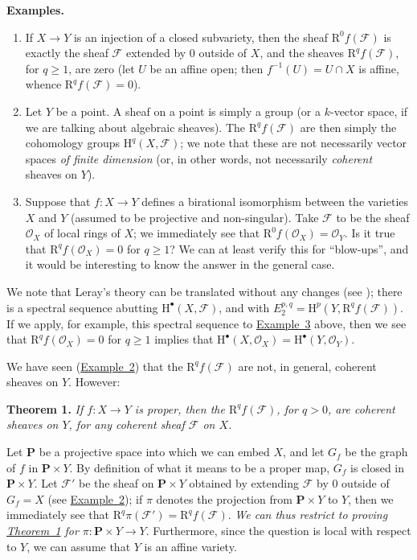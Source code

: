\documentclass{article}
\newenvironment{itenv}[1]
  {\phantomsection\par\medskip\noindent\textbf{#1.}\itshape}
  {\par\medskip}
\newenvironment{rmenv}[1]
  {\phantomsection\par\medskip\noindent\textbf{#1.}\rmfamily}
  {\par\medskip}
\newcommand{\scr}[1]{{\mathscr{#1}}}
\newcommand{\HH}{\mathrm{H}}
\newcommand{\RR}{\mathrm{R}}
\newcommand{\PP}{\mathbf{P}}
\renewcommand{\geq}{\geqslant}
\newcommand{\oldpage}[1]{\marginpar{\footnotesize$\Big\vert$ \textit{p.~#1}}}
\begin{document}
\begin{rmenv}{Examples}
  \phantom{.}
  \begin{enumerate}
    \item If $X\to Y$ is an injection of a closed subvariety, then the sheaf $\RR^0f(\scr{F})$ is exactly the sheaf $\scr{F}$ extended by $0$ outside of $X$, and the sheaves $\RR^qf(\scr{F})$, for $q\geq1$, are zero (let $U$ be an affine open; then $f^{-1}(U)=U\cap X$ is affine, whence $\RR^qf(\scr{F})=0$).
      \label{example1}
    \item Let $Y$ be a point.
      A sheaf on a point is simply a group (or a $k$-vector space, if we are talking about algebraic sheaves).
      The $\RR^qf(\scr{F})$ are then simply the cohomology groups $\HH^q(X,\scr{F})$;
      we note that these are not necessarily vector spaces \emph{of finite dimension} (or, in other words, not necessarily \emph{coherent} sheaves on $Y$).
        \label{example2}
    \item Suppose that $f\colon X\to Y$ defines a birational isomorphism between the varieties $X$ and $Y$ (assumed to be projective and non-singular).
      Take $\scr{F}$ to be the sheaf $\scr{O}_X$ of local rings of $X$;
      we immediately see that $\RR^0f(\scr{O}_X)=\scr{O}_Y$.
      Is it true that $\RR^qf(\scr{O}_X)=0$ for $q\geq1$?
      We can at least verify this for ``blow-ups'', and it would be interesting to know the answer in the general case.
      \label{example3}
  \end{enumerate}
\end{rmenv}

We note that Leray's theory can be translated without any changes (see \cite{7});
there is a spectral sequence abutting $\HH^\bullet(X,\scr{F})$, and with $E_2^{p,q}=\HH^p(Y,\RR^qf(\scr{F}))$.
If we apply, for example, this spectral sequence
\oldpage{103}
to \hyperref[example3]{Example~3} above, then we see that $\RR^qf(\scr{O}_X)=0$ for $q\geq1$ implies that $\HH^\bullet(X,\scr{O}_X)=\HH^\bullet(Y,\scr{O}_Y)$.

We have seen (\hyperref[example2]{Example~2}) that the $\RR^qf(\scr{F})$ are not, in general, coherent sheaves on $Y$.
However:

\begin{itenv}{Theorem 1}
\label{theorem1}
  If $f\colon X\to Y$ is proper, then the $\RR^qf(\scr{F})$, for $q>0$, are coherent sheaves on $Y$, for any coherent sheaf $\scr{F}$ on $X$.
\end{itenv}

Let $\PP$ be a projective space into which we can embed $X$, and let $G_f$ be the graph of $f$ in $\PP\times Y$.
By definition of what it means to be a proper map, $G_f$ is closed in $\PP\times Y$.
Let $\scr{F}'$ be the sheaf on $\PP\times Y$ obtained by extending $\scr{F}$ by $0$ outside of $G_f=X$ (see \hyperref[example2]{Example~2});
if $\pi$ denotes the projection from $\PP\times Y$ to $Y$, then we immediately see that $\RR^q\pi(\scr{F}')=\RR^qf(\scr{F})$.
\emph{We can thus restrict to proving \hyperref[theorem1]{Theorem~1} for $\pi\colon \PP\times Y\to Y$}.
Furthermore, since the question is local with respect to $Y$, we can assume that $Y$ is an affine variety.
\end{document}
